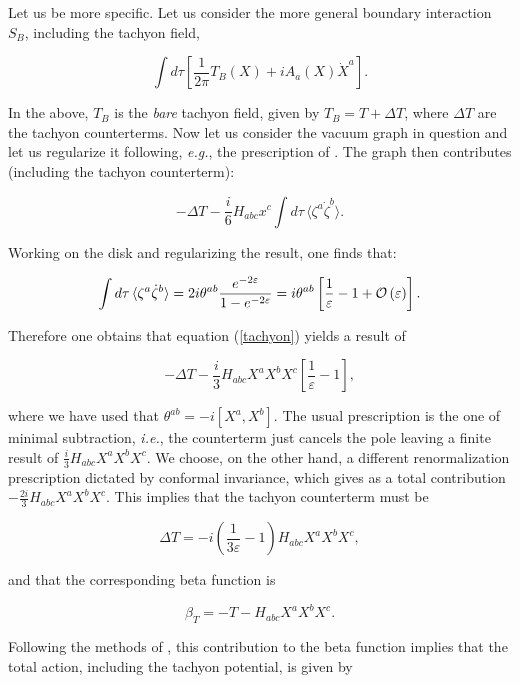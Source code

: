 \documentclass[a4paper,11pt]{article}
\begin{document}
Let us be more specific. Let us consider the more general boundary 
interaction $S_B$, including the tachyon field,

$$
\int d\tau \left[ \frac{1}{2\pi }T_B\left( X\right) +iA_{a}\left( 
X\right) \dot{X}^{a}\right] .
$$

\noindent
In the above, $T_B$ is the {\it bare} tachyon field, given by
$T_B = T+\Delta T$, where $\Delta T$ are the tachyon counterterms.
Now let us consider the vacuum graph in question and let us
regularize it following, \textit{e.g.}, the prescription of 
\cite{Tseytlin-BSFT}. The graph then contributes (including the tachyon 
counterterm):

\begin{equation} \label{tachyon}
- \Delta T -\frac{i}{6}H_{abc}x^{c}\int d\tau \, \langle \zeta 
^{a}\dot{\zeta}^{b} \rangle .
\end{equation}

\noindent
Working on the disk and regularizing \cite{Tseytlin-BSFT} the result, one finds 
that:

$$
\int d\tau \, \langle \zeta ^{a}\dot{\zeta}^{b} \rangle =
2i\theta ^{ab}\frac{e^{-2\varepsilon }}{1-e^{-2\varepsilon }} 
= i\theta ^{ab}\left[ \frac{1}{\varepsilon } - 1 + {\cal O}\left( \varepsilon 
\right) \right] .
$$

\noindent
Therefore one obtains that equation (\ref{tachyon}) yields a result of

$$
-\Delta T - \frac{i}{3}H_{abc}X^a X^b X^c \left[ \frac{1}
{\varepsilon }-1\right] ,
$$

\noindent
where we have used that $\theta^{ab} = -i [X^a,X^b]$. The usual 
prescription is the one of minimal subtraction, {\it i.e.}, the counterterm 
just cancels the pole leaving a finite result of $\frac{i}{3} H_{abc} X^a X^b 
X^c$. We choose, on the other hand, a different renormalization prescription 
dictated by conformal invariance, which gives as a total contribution 
$-\frac{2i}{3} H_{abc} X^a X^b X^c$. This implies that the tachyon counterterm 
must be

$$
\Delta T= -i\left( \frac{1}{3\varepsilon }-1\right)
H_{abc} X^a X^b X^c  ,
$$

\noindent
and that the corresponding beta function is

$$
\beta _{T}=-T-H_{abc}X^a X^b X^c.
$$

\noindent
Following the methods of \cite{Witten-BSFT, Shatashvili-BSFT, 
Tseytlin-BSFT}, this contribution to the beta function implies that the 
total action, including the tachyon potential, is given by
\end{document}
